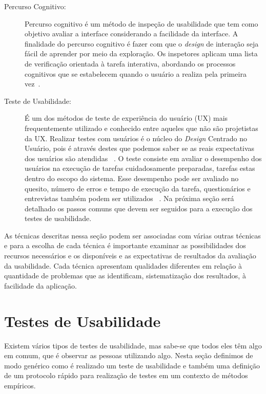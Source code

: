 \begin{description}

	
\item[Percurso Cognitivo:]

Percurso cognitivo é um método de inspeção de usabilidade que tem como objetivo avaliar a interface considerando a facilidade da interface. A finalidade do percurso cognitivo é fazer com que o \emph{design} de interação seja fácil de aprender por meio da exploração. Os inspetores aplicam uma lista de verificação orientada à tarefa interativa, abordando os processos cognitivos que se estabelecem quando o usuário a realiza pela primeira vez~\cite{cybis2010}.


\item[Teste de Usabilidade:]

É um dos métodos de teste de experiência do usuário (UX) mais frequentemente utilizado e conhecido entre aqueles que não são projetistas da UX. Realizar testes com usuários é o núcleo do \emph{Design} Centrado no Usuário, pois é através destes que podemos saber se as reais expectativas dos usuários são atendidas ~\cite{santos2012}.
%
O teste consiste em avaliar o desempenho dos usuários na execução de tarefas cuidadosamente preparadas, tarefas estas dentro do escopo do sistema. Esse desempenho pode ser avaliado no quesito, número de erros e tempo de execução da tarefa, questionários e entrevistas também podem ser utilizados ~\cite{preece2007}. Na próxima seção será detalhado os passos comuns que devem ser seguidos para a execução dos testes de usabilidade.

\end{description}

	As técnicas descritas nessa seção podem ser associadas com várias outras técnicas e para a escolha de cada técnica é importante examinar as possibilidades dos recursos necessários e os disponíveis e as expectativas de resultados da avaliação da usabilidade. Cada técnica apresentam qualidades diferentes em relação à quantidade de problemas que as identificam, sistematização dos resultados, à facilidade da aplicação. 
%

\section{Testes de Usabilidade}
\label{teste_u}

	Existem vários tipos de testes de usabilidade, mas sabe-se que todos eles têm algo em comum, que é observar as pessoas utilizando algo. Nesta seção definimos de modo genérico como é realizado um teste de usabilidade e também uma definição de um protocolo rápido para realização de testes em um contexto de métodos empíricos.

